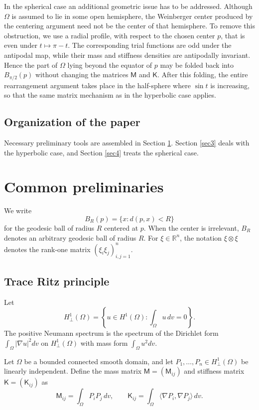 \documentclass[10pt,a4paper]{amsart}
\newcommand{\RR}{\mathbb R}
\newcommand{\mcM}{\mathsf M}
\newcommand{\mcK}{\mathsf K}
\begin{document}
In the spherical case an additional geometric issue has to be addressed.
Although $\Omega$ is assumed to lie in some open hemisphere, the Weinberger
center produced by the centering argument need not be the center of that
hemisphere.  To remove this obstruction, we use a radial profile, with
respect to the chosen center $p$, that is even under $t\mapsto \pi-t$.  The
corresponding trial functions are odd under the antipodal map, while their
mass and stiffness densities are antipodally invariant.  Hence the part of
$\Omega$ lying beyond the equator of $p$ may be folded back into
$B_{\pi/2}(p)$ without changing the matrices $\mcM$ and $\mcK$.  After this
folding, the entire rearrangement argument takes place in the half-sphere
where $\sin t$ is increasing, so that the same matrix mechanism as in the
hyperbolic case applies.

\subsection{Organization of the paper}
Necessary preliminary tools are assembled in Section \ref{sec2}. Section \ref{sec3} deals with the hyperbolic case, and Section \ref{sec4} treats the spherical case.

\section{Common preliminaries}\label{sec2}

We write
$$
        B_R(p)=\{x:d(p,x)<R\}
$$
for the geodesic ball of radius $R$ centered at $p$.  When the center is irrelevant, $B_R$ denotes an arbitrary geodesic ball of radius $R$.  For $\xi\in\RR^n$, the notation $\xi\otimes\xi$ denotes the rank-one matrix $(\xi_i\xi_j)_{i,j=1}^n$.

\subsection{Trace Ritz principle}

Let
$$
        H^1_{\perp}(\Omega)=\left\{u\in H^1(\Omega):\int_\Omega u\,dv=0\right\}.
$$
The positive Neumann spectrum is the spectrum of the Dirichlet form $\int_\Omega |\nabla u|^2dv$ on $H^1_{\perp}(\Omega)$ with mass form $\int_\Omega u^2dv$.

Let $\Omega$ be a bounded connected smooth domain, and let $P_1,\dots,P_n\in H^1_{\perp}(\Omega)$ be linearly independent.  Define the mass matrix $\mcM=(\mcM_{ij})$ and stiffness matrix $\mcK=(\mcK_{ij})$ as
\begin{equation}\label{eq:hyperbolic-MK-def}
        \mcM_{ij}=\int_\Omega P_iP_j\,dv,
        \qquad
        \mcK_{ij}=\int_\Omega \langle\nabla P_i,\nabla P_j\rangle\,dv.
\end{equation}
\end{document}
